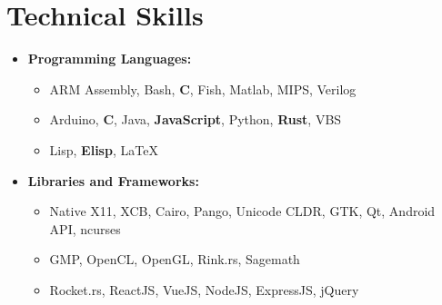 \documentclass[10pt,letterpaper,sans]{moderncv}
\renewcommand{\_}{\textscale{.7}{\textunderscore}}
\newcommand{\Rplus}{\protect\hspace{-.1em}\protect\raisebox{.35ex}{\smaller{\smaller\textbf{+}}}}
\newcommand{\Cpp}{\mbox{C\Rplus\Rplus}\xspace}
\begin{document}
\section{Technical Skills}
\begin{itemize}
\item \textbf{Programming Languages:}
  \begin{itemize}
    \item {} ARM Assembly, Bash, \textbf{C}, Fish, Matlab, MIPS, Verilog
    \item {} Arduino, \textbf{\Cpp}, Java, \textbf{JavaScript}, Python, \textbf{Rust}, VBS
    \item {} Lisp, \textbf{Elisp}, \LaTeX
  \end{itemize}
\item \textbf{Libraries and Frameworks:} 
  \begin{itemize}
  \item {} Native X11, XCB, Cairo, Pango, Unicode CLDR,
    GTK, Qt, Android API, ncurses
  \item {} GMP, OpenCL, OpenGL, Rink.rs, Sagemath
  \item {} Rocket.rs, ReactJS, VueJS, NodeJS, ExpressJS, jQuery
  \end{itemize}
\end{itemize}
\end{document}
